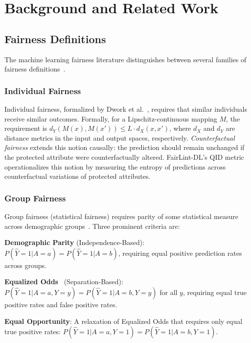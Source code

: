 \chapter{Background and Related Work}
\label{ch:background}

\section{Fairness Definitions}

The machine learning fairness literature distinguishes between several families of fairness definitions~\cite{barocas-hardt-narayanan}.

\subsection{Individual Fairness}

Individual fairness, formalized by Dwork et al.~\cite{dwork2012}, requires that similar individuals receive similar outcomes. Formally, for a Lipschitz-continuous mapping $M$, the requirement is $d_Y(M(x), M(x')) \leq L \cdot d_X(x, x')$, where $d_X$ and $d_Y$ are distance metrics in the input and output spaces, respectively. \emph{Counterfactual fairness} extends this notion causally: the prediction should remain unchanged if the protected attribute were counterfactually altered. FairLint-DL's QID metric operationalizes this notion by measuring the entropy of predictions across counterfactual variations of protected attributes.

\subsection{Group Fairness}

Group fairness (statistical fairness) requires parity of some statistical measure across demographic groups~\cite{barocas-hardt-narayanan}. Three prominent criteria are:

\textbf{Demographic Parity} (Independence-Based): $P(\hat{Y}=1 | A=a) = P(\hat{Y}=1 | A=b)$, requiring equal positive prediction rates across groups.

\textbf{Equalized Odds}~\cite{hardt2016} (Separation-Based): $P(\hat{Y}=1 | A=a, Y=y) = P(\hat{Y}=1 | A=b, Y=y)$ for all $y$, requiring equal true positive rates and false positive rates.

\textbf{Equal Opportunity}: A relaxation of Equalized Odds that requires only equal true positive rates: $P(\hat{Y}=1 | A=a, Y=1) = P(\hat{Y}=1 | A=b, Y=1)$.

